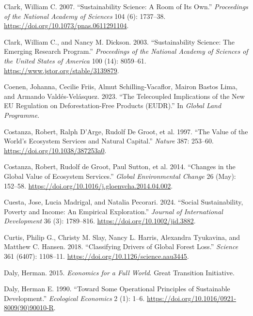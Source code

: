 \documentclass[
  a4paper,
  DIV=11,
  numbers=noendperiod,
  oneside,
  openany]{scrreprt}
\newlength{\cslhangindent}
\newenvironment{CSLReferences}[2] %
 {\begin{list}{}{%
  \setlength{\itemindent}{0pt}
  \setlength{\leftmargin}{0pt}
  \setlength{\parsep}{0pt}
  \ifodd #1
   \setlength{\leftmargin}{\cslhangindent}
   \setlength{\itemindent}{-1\cslhangindent}
  \fi
  \setlength{\itemsep}{#2\baselineskip}}}
 {\end{list}}
\begin{document}
\begin{CSLReferences}{1}{1}
Clark, William C. 2007. {``Sustainability {Science}: {A} Room of Its
Own.''} \emph{Proceedings of the National Academy of Sciences} 104 (6):
1737--38. \url{https://doi.org/10.1073/pnas.0611291104}.

Clark, William C., and Nancy M. Dickson. 2003. {``Sustainability
{Science}: {The Emerging Research Program}.''} \emph{Proceedings of the
National Academy of Sciences of the United States of America} 100 (14):
8059--61. \url{https://www.jstor.org/stable/3139879}.

Coenen, Johanna, Cecilie Friis, Almut Schilling-Vacaflor, Mairon Bastos
Lima, and Armando Valdés-Velásquez. 2023. {``The Telecoupled
Implications of the New {EU Regulation} on Deforestation-Free Products
({EUDR}).''} In \emph{Global Land Programme}.

Costanza, Robert, Ralph D'Arge, Rudolf De Groot, et al. 1997. {``The
{Value} of the {World}'s {Ecosystem} {Services} and {Natural}
{Capital}.''} \emph{Nature} 387: 253--60.
\url{https://doi.org/10.1038/387253a0}.

Costanza, Robert, Rudolf de Groot, Paul Sutton, et al. 2014. {``Changes
in the Global Value of Ecosystem Services.''} \emph{Global Environmental
Change} 26 (May): 152--58.
\url{https://doi.org/10.1016/j.gloenvcha.2014.04.002}.

Cuesta, Jose, Lucia Madrigal, and Natalia Pecorari. 2024. {``Social
Sustainability, Poverty and Income: {An} Empirical Exploration.''}
\emph{Journal of International Development} 36 (3): 1789--816.
\url{https://doi.org/10.1002/jid.3882}.

Curtis, Philip G., Christy M. Slay, Nancy L. Harris, Alexandra
Tyukavina, and Matthew C. Hansen. 2018. {``Classifying Drivers of Global
Forest Loss.''} \emph{Science} 361 (6407): 1108--11.
\url{https://doi.org/10.1126/science.aau3445}.

Daly, Herman. 2015. \emph{Economics for a {Full World}}. Great
Transition Initiative.

Daly, Herman E. 1990. {``Toward Some Operational Principles of
Sustainable Development.''} \emph{Ecological Economics} 2 (1): 1--6.
\url{https://doi.org/10.1016/0921-8009(90)90010-R}.


\end{CSLReferences}
\end{document}
